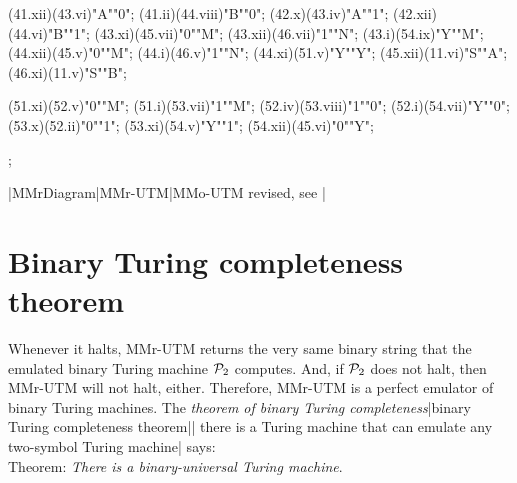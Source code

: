 \MTinput(41.xii)(43.vi)"A""0";
\MTinput(41.ii)(44.viii)"B""0";
\MTinput(42.x)(43.iv)"A""1";
\MTinput(42.xii)(44.vi)"B""1";
\MTinput(43.xi)(45.vii)"0""M";
\MTinput(43.xii)(46.vii)"1""N";
\MTinput(43.i)(54.ix)"Y""M";
\MTinput(44.xii)(45.v)"0""M";
\MTinput(44.i)(46.v)"1""N";
\MTinput(44.xi)(51.v)"Y""Y";
\MTinput(45.xii)(11.vi)"S""A";
\MTinput(46.xi)(11.v)"S""B";

\MTinput(51.xi)(52.v)"0""M";
\MTinput(51.i)(53.vii)"1""M";
\MTinput(52.iv)(53.viii)"1""0";
\MTinput(52.i)(54.vii)"Y""0";
\MTinput(53.x)(52.ii)"0""1";
\MTinput(53.xi)(54.v)"Y""1";
\MTinput(54.xii)(45.vi)"0""Y";


\MTendfig;

\dest
\centerline{|MMrDiagram|MMr-UTM|MMo-UTM
 revised, see |\box\MTbox}

\vfil\break

\section{Binary Turing completeness theorem}

\dest
Whenever it halts,
MMr-UTM returns the very same binary string that
the emulated binary Turing machine ${\cal P}_2$ computes. And,
if ${\cal P}_2$ does not halt, then MMr-UTM will not halt, either.
Therefore, MMr-UTM is a perfect emulator of binary Turing machines.
The {\em theorem of binary Turing completeness}|binary Turing completeness theorem||%
there is a Turing machine that can emulate any two-symbol Turing machine| says:\\
{\sc Theorem}: {\em There is a binary-universal Turing machine}.

